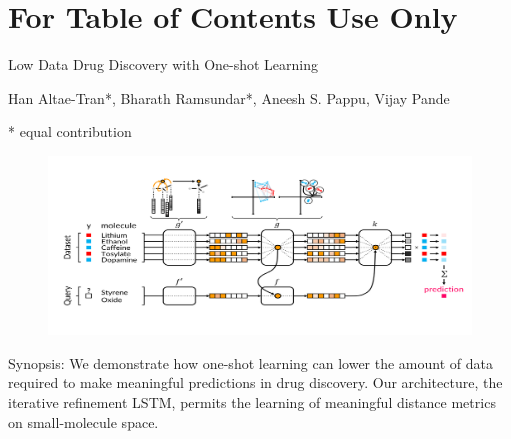 \documentclass[journal=jacsat,manuscript=article]{achemso}
\begin{document}


\newpage
\section*{For Table of Contents Use Only}
{\huge \centering Low Data Drug Discovery with One-shot Learning}

{\Large Han Altae-Tran*, Bharath Ramsundar*, Aneesh S. Pappu, Vijay Pande}

* equal contribution

\begin{figure}[H]
\includegraphics{For_Table_Of_Contents_Only.png}
\end{figure}

Synopsis: We demonstrate how one-shot learning can lower the amount of data required to make meaningful predictions in drug discovery. Our architecture, the iterative refinement LSTM, permits the learning of meaningful distance metrics on small-molecule space.
\end{document}
